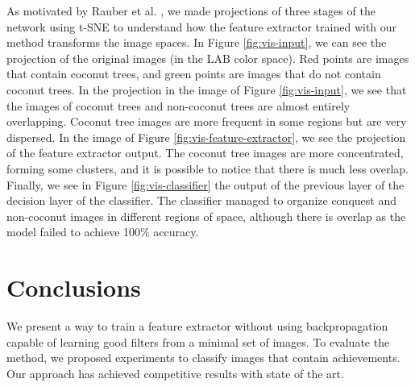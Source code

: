 \documentclass[a4paper,conference]{IEEEtran}
\begin{document}
As motivated by Rauber et al. \cite{rauber2016visualizing}, we made projections of three stages of the network using t-SNE \cite{maaten2008visualizing} to understand how the feature extractor trained with our method transforms the image spaces. In Figure \ref{fig:vis-input}, we can see the projection of the original images (in the LAB color space). Red points are images that contain coconut trees, and green points are images that do not contain coconut trees. In the projection in the image of Figure \ref{fig:vis-input}, we see that the images of coconut trees and non-coconut trees are almost entirely overlapping. Coconut tree images are more frequent in some regions but are very dispersed. In the image of Figure \ref{fig:vis-feature-extractor}, we see the projection of the feature extractor output. The coconut tree images are more concentrated, forming some clusters, and it is possible to notice that there is much less overlap. Finally, we see in Figure \ref{fig:vis-classifier} the output of the previous layer of the decision layer of the classifier. The classifier managed to organize conquest and non-coconut images in different regions of space, although there is overlap as the model failed to achieve 100\% accuracy.

\section{Conclusions}

We present a way to train a feature extractor without using backpropagation capable of learning good filters from a minimal set of images. To evaluate the method, we proposed experiments to classify images that contain achievements. Our approach has achieved competitive results with state of the art.



\end{document}
